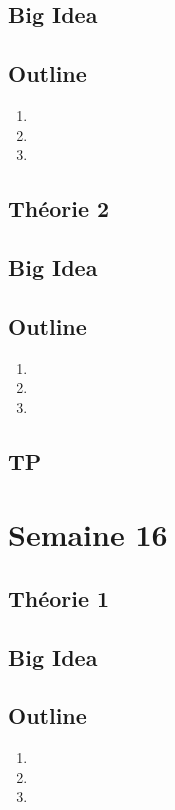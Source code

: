 \documentclass{article}
\begin{document}
\subsection*{Big Idea}
\subsection*{Outline}
\begin{enumerate}
    \item
    \item
    \item
\end{enumerate}
\subsection{Théorie 2}
\subsection*{Big Idea}
\subsection*{Outline}
\begin{enumerate}
    \item
    \item
    \item
\end{enumerate}
\subsection{TP}

\pagebreak
\section{Semaine 16}
\subsection{Théorie 1}
\subsection*{Big Idea}
\subsection*{Outline}
\begin{enumerate}
    \item
    \item
    \item
\end{enumerate}
\end{document}
